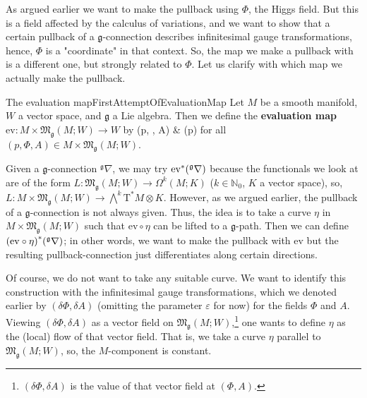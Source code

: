 As argued earlier we want to make the pullback using $\Phi$, the Higgs field. But this is a field affected by the calculus of variations, and we want to show that a certain pullback of a $\mathfrak{g}$-connection describes infinitesimal gauge transformations, hence, $\Phi$ is a "coordinate" in that context. So, the map we make a pullback with is a different one, but strongly related to $\Phi$. Let us clarify with which map we actually make the pullback.

\begin{definitions}{The evaluation map}{FirstAttemptOfEvaluationMap}
Let $M$ be a smooth manifold, $W$ a vector space, and $\mathfrak{g}$ a Lie algebra. Then we define the \textbf{evaluation map} $\mathrm{ev}: M \times \mathfrak{M}_{\mathfrak{g}}(M; W) \to W$ by
\ba
{}(p, \Phi, A)
&\coloneqq
\Phi(p)
\ea
for all $(p, \Phi, A) \in M \times \mathfrak{M}_{\mathfrak{g}}(M; W)$.
\end{definitions}

Given a $\mathfrak{g}$-connection ${}^{\mathfrak{g}}\nabla$, we may try $\mathrm{ev}^*\mleft( {}^{\mathfrak{g}}\nabla \mright)$ because the functionals we look at are of the form $L: \mathfrak{M}_{\mathfrak{g}}(M; W) \to \Omega^k(M; K)$ ($k \in \mathbb{N}_0$, $K$ a vector space), so, $L: M\times \mathfrak{M}_{\mathfrak{g}}(M; W) \to \bigwedge^k \mathrm{T}^*M \otimes K$. However, as we argued earlier, the pullback of a $\mathfrak{g}$-connection is not always given. Thus, the idea is to take a curve $\eta$ in $M \times \mathfrak{M}_{\mathfrak{g}}(M; W)$ such that $\mathrm{ev} \circ \eta$ can be lifted to a $\mathfrak{g}$-path. Then we can define $\mleft(\mathrm{ev} \circ \eta\mright)^*\mleft( {}^{\mathfrak{g}}\nabla \mright)$; in other words, we want to make the pullback with $\mathrm{ev}$ but the resulting pullback-connection just differentiates along certain directions.

Of course, we do not want to take any suitable curve. We want to identify this construction with the infinitesimal gauge transformations, which we denoted earlier by $(\delta \Phi, \delta A)$ (omitting the parameter $\varepsilon$ for now) for the fields $\Phi$ and $A$. Viewing $(\delta \Phi, \delta A)$ as a vector field on $\mathfrak{M}_{\mathfrak{g}}(M; W)$,\footnote{$(\delta \Phi, \delta A)$ is the value of that vector field at $(\Phi, A)$.} one wants to define $\eta$ as the (local) flow of that vector field. That is, we take a curve $\eta$ parallel to $\mathfrak{M}_{\mathfrak{g}}(M; W)$, so, the $M$-component is constant. 

